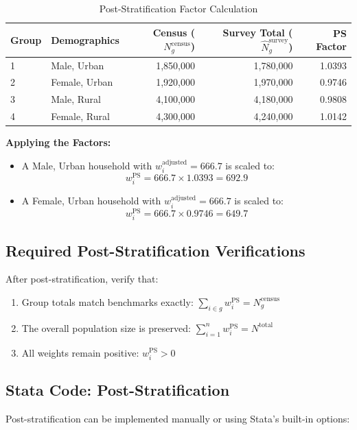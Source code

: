 \documentclass[11pt,a4paper]{article}
\begin{document}
\begin{table}[htbp]
  \centering
  \caption{Post-Stratification Factor Calculation}
  \label{tab:ps_worked_example}
  \begin{tabular}{llrrr}
    \toprule
    \textbf{Group} & \textbf{Demographics} & \textbf{Census ($N_g^{\text{census}}$)} & \textbf{Survey Total ($\hat{N}_g^{\text{survey}}$)} & \textbf{PS Factor} \\
    \midrule
    1 & Male, Urban & 1,850,000 & 1,780,000 & 1.0393 \\
    2 & Female, Urban & 1,920,000 & 1,970,000 & 0.9746 \\
    3 & Male, Rural & 4,100,000 & 4,180,000 & 0.9808 \\
    4 & Female, Rural & 4,300,000 & 4,240,000 & 1.0142 \\
    \bottomrule
  \end{tabular}
\end{table}

\newpage

\textbf{Applying the Factors:}
\begin{itemize}
  \item A Male, Urban household with $w_i^{\text{adjusted}} = 666.7$ is scaled to:
  \[
    w_i^{\text{PS}} = 666.7 \times 1.0393 = 692.9
  \]
  \item A Female, Urban household with $w_i^{\text{adjusted}} = 666.7$ is scaled to:
  \[
    w_i^{\text{PS}} = 666.7 \times 0.9746 = 649.7
  \]
\end{itemize}

\subsection{Required Post-Stratification Verifications}
After post-stratification, verify that:
\begin{enumerate}
  \item Group totals match benchmarks exactly: $\sum_{i \in g} w_i^{\text{PS}} = N_g^{\text{census}}$
  \item The overall population size is preserved: $\sum_{i=1}^{n} w_i^{\text{PS}} = N^{\text{total}}$
  \item All weights remain positive: $w_i^{\text{PS}} > 0$
\end{enumerate}

\subsection{Stata Code: Post-Stratification}
Post-stratification can be implemented manually or using Stata's built-in options:
\end{document}
